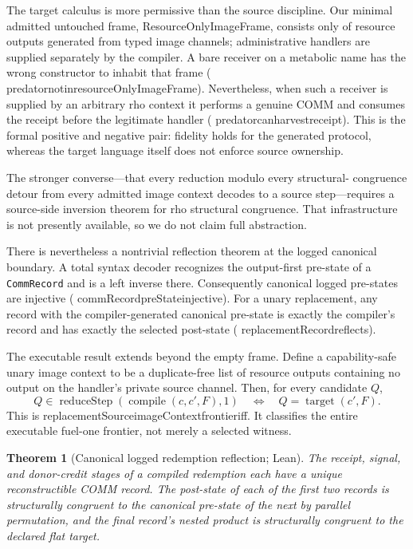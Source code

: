 \documentclass[11pt]{article}
\newtheorem{theorem}{Theorem}[section]
\newcommand{\code}[1]{\texttt{#1}}
\newcommand{\leanname}[1]{{\scriptsize\ttfamily
  \def\_{\textunderscore\allowbreak}#1}}
\begin{document}
The target calculus is more permissive than the source discipline.  Our
minimal admitted untouched frame, \leanname{ResourceOnlyImageFrame}, consists
only of resource outputs generated from typed image channels; administrative
handlers are supplied separately by the compiler.  A bare receiver on a
metabolic name has the wrong constructor to inhabit that frame
(\leanname{predator\_not\_in\_resourceOnlyImageFrame}).  Nevertheless, when
such a receiver is supplied by an arbitrary rho context it performs a genuine
COMM and consumes the receipt before the legitimate handler
(\leanname{predator\_can\_harvest\_receipt}).  This is the formal positive and
negative pair: fidelity holds for the generated protocol, whereas the target
language itself does not enforce source ownership.

The stronger converse---that every reduction modulo every structural-
congruence detour from every admitted image context decodes to a source
step---requires a source-side inversion theorem for rho structural
congruence.  That infrastructure is not presently available, so we do not
claim full abstraction.

There is nevertheless a nontrivial reflection theorem at the logged canonical
boundary.  A total syntax decoder recognizes the output-first pre-state of a
\code{CommRecord} and is a left inverse there.  Consequently canonical logged
pre-states are injective (\leanname{commRecord\_preState\_injective}).  For a
unary replacement, any record with the compiler-generated canonical pre-state
is exactly the compiler's record and has exactly the selected post-state
(\leanname{replacementRecord\_reflects}).

The executable result extends beyond the empty frame.  Define a capability-safe
unary image context to be a duplicate-free list of resource outputs containing
no output on the handler's private source channel.  Then, for every candidate
$Q$,
\[
 Q\in\operatorname{reduceStep}(\operatorname{compile}(c,c',F),1)
 \quad\Longleftrightarrow\quad
 Q=\operatorname{target}(c',F).
\]
This is
\leanname{replacementSource\_imageContext\_frontier\_iff}.  It classifies the
entire executable fuel-one frontier, not merely a selected witness.

\begin{theorem}[Canonical logged redemption reflection; Lean]
The receipt, signal, and donor-credit stages of a compiled redemption each
have a unique reconstructible COMM record.  The post-state of each of the
first two records is structurally congruent to the canonical pre-state of the
next by parallel permutation, and the final record's nested product is
structurally congruent to the declared flat target.
\end{theorem}
\end{document}
